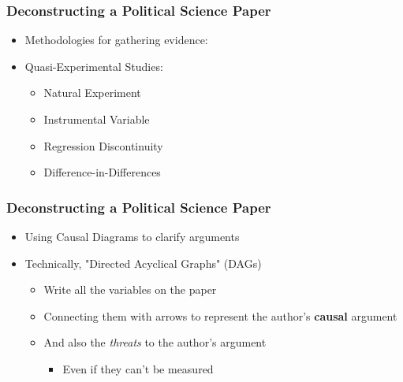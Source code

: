 \documentclass[xcolor=x11names,compress]{beamer}\usepackage[]{graphicx}\usepackage[]{color}
\renewcommand{\(}{\begin{columns}}
\renewcommand{\)}{\end{columns}}
\newcommand{\<}[1]{\begin{column}{#1}}
\renewcommand{\>}{\end{column}}
\begin{document}
\begin{frame}
\begin{frame}
\begin{frame}
\frametitle{Deconstructing a Political Science Paper}
\begin{itemize}
\item Methodologies for gathering evidence:
\item Quasi-Experimental Studies:
\begin{itemize}
\item Natural Experiment
\item Instrumental Variable
\item Regression Discontinuity
\item Difference-in-Differences
\end{itemize}
\end{itemize}
\end{frame}






\begin{frame}
\frametitle{Deconstructing a Political Science Paper}
\begin{itemize}
\item Using Causal Diagrams to clarify arguments
\item Technically, "Directed Acyclical Graphs" (DAGs)
\begin{itemize}
\item Write all the variables on the paper
\item Connecting them with arrows to represent the author's \textbf{causal} argument
\item And also the \textit{threats} to the author's argument
\begin{itemize}
\item Even if they can't be measured
\end{itemize}
\end{itemize}
\end{itemize}
\end{frame}


\end{frame}
\end{frame}
\end{document}
